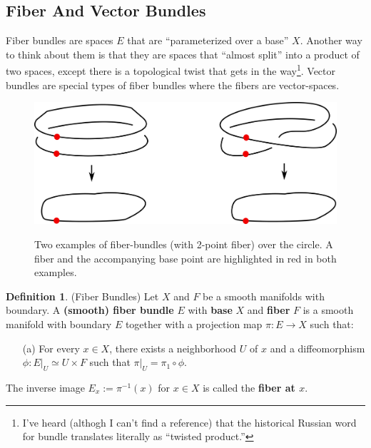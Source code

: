 \documentclass[12pt]{article}
\theoremstyle{definition}
\newtheorem{definition}[theorem]{Definition}
\numberwithin{equation}{section}
\begin{document}
\subsection{Fiber And Vector Bundles} \label{subsec:fiber_bundles} Fiber bundles are spaces $E$ that are ``parameterized over a base'' $X$. Another way to think about them is that they are spaces that ``almost split'' into a product of two spaces, except there is a topological twist that gets in the way\footnote{I've heard (althogh I can't find a reference) that the historical Russian word for bundle translates literally as ``twisted product.''}. Vector bundles are special types of fiber bundles where the fibers are vector-spaces.
\vspace{5pt}
\begin{figure}[h]
    \centering
    \includegraphics[width=.7\textwidth]{reu_figures/fiber_bundle.png}
    \label{fig:fiber_bundle}
    \caption{Two examples of fiber-bundles (with 2-point fiber) over the circle. A fiber and the accompanying base point are highlighted in red in both examples.}
\end{figure}

\begin{definition} \label{def:fiber_bundles} (Fiber Bundles) Let $X$ and $F$ be a smooth manifolds with boundary. A {\bf (smooth) fiber bundle} $E$ with {\bf base} $X$ and {\bf fiber} $F$ is a smooth manifold with boundary $E$ together with a projection map $\pi:E \to X$ such that:
\begin{itemize}
	\item[(a)] For every $x \in X$, there exists a neighborhood $U$ of $x$ and a diffeomorphism $\phi:E|_U \simeq U \times F$ such that $\pi|_U = \pi_1 \circ \phi$.
\end{itemize}
The inverse image $E_x := \pi^{-1}(x)$ for $x \in X$ is called the {\bf fiber at $x$}.
\end{definition}
\end{document}
